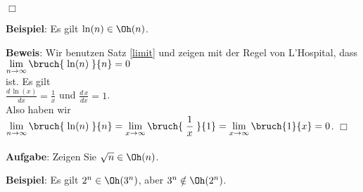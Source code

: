 \hspace*{\fill} $\Box$
\vspace*{0.3cm}

\noindent
\textbf{Beispiel}: Es gilt $\ln(n) \in \Oh(n)$.
\vspace*{0.3cm}

\noindent
\textbf{Beweis}: Wir benutzen Satz \ref{limit} und zeigen mit der Regel von L'Hospital,
dass \\[0.1cm]
\hspace*{1.3cm} 
$\lim\limits_{n \rightarrow \infty} \bruch{\;\ln(n)\;}{n} = 0$
\\[0.1cm]
ist.  Es gilt \\[0.1cm]
\hspace*{1.3cm} $\displaystyle \frac{d\, \ln(x)}{dx} = \frac{1}{x}$ 
\quad und \quad
 $\displaystyle \frac{d\, x}{dx} = 1$. \\[0.1cm]
Also haben wir \\[0.1cm]
\hspace*{1.3cm} 
$\displaystyle \lim\limits_{n \rightarrow \infty} \bruch{\;\ln(n)\;}{n} = 
\lim\limits_{x \rightarrow \infty} \bruch{\rule[-10pt]{0pt}{10pt}\;\frac{1}{x}\;}{1} = 
\lim\limits_{x \rightarrow \infty} \bruch{1}{x} = 0$. \hspace*{\fill} $\Box$
\vspace*{0.3cm}

\noindent
\textbf{Aufgabe}:  Zeigen Sie $\sqrt{n} \in \Oh(n)$.
\vspace*{0.3cm}

\noindent
\textbf{Beispiel}:  Es gilt $2^n \in \Oh(3^n)$, aber $3^n \notin \Oh(2^n)$.
\vspace*{0.3cm}

